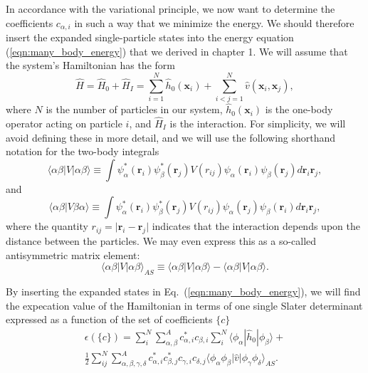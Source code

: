 In accordance with the variational principle, we now want to determine
the coefficients $c_{\alpha, i}$ in such a way that we minimize the
energy. We should therefore insert the expanded single-particle states
into the energy equation (\ref{eqn:many_body_energy}) that we derived
in chapter 1. We will assume that the system's Hamiltonian has the form
\begin{equation}
\hat{H} = \hat{H}_0 + \hat{H}_I = \sum_{i=1}^N \hat{h}_0(\mathbf{x}_i) + \sum_{i<j=1}^N \hat{v}(\mathbf{x}_i,\mathbf{x}_j),
\end{equation}
where $N$ is the number of particles in our system,
$\hat{h}_0(\mathbf{x}_i)$ is the one-body operator acting on particle
$i$, and $\hat{H}_I$ is the interaction. For simplicity, we will avoid
defining these in more detail, and we will use the following shorthand
notation for the two-body integrals
\begin{equation}
\langle \alpha \beta \vert V \vert \alpha \beta \rangle \equiv \int \psi_\alpha^*(\mathbf{r}_i) \psi_\beta^*(\mathbf{r}_j) V(r_{ij})  \psi_\alpha(\mathbf{r}_i) \psi_\beta(\mathbf{r}_j) d\mathbf{r}_i\mathbf{r}_j,
\end{equation}
and
\begin{equation}
\langle \alpha \beta \vert V \beta \alpha \rangle \equiv \int \psi_\alpha^*(\mathbf{r}_i) \psi_\beta^*(\mathbf{r}_j) V(r_{ij})  \psi_\alpha(\mathbf{r}_j) \psi_\beta(\mathbf{r}_i) d\mathbf{r}_i\mathbf{r}_j,
\end{equation}
where the quantity $r_{ij} = \vert \mathbf{r}_i - \mathbf{r}_j \vert$ indicates that the interaction depends upon the distance between the particles. We may even express this as a so-called  antisymmetric matrix element:
\begin{equation}
\langle \alpha \beta \vert V \vert \alpha \beta \rangle_{AS}  \equiv \langle \alpha \beta \vert V \vert \alpha \beta \rangle - \langle \alpha \beta \vert V \vert \alpha \beta \rangle.
\end{equation}

By inserting the expanded states in Eq.~(\ref{eqn:many_body_energy}), we will find the expecation value  
of the Hamiltonian in terms of one single Slater determinant expressed as a function of the set of coefficients $\{c\}$
\begin{multline}
 \epsilon (\{c\}) = \sum_i^N\sum_{\alpha, \beta}^A c_{\alpha,i}^{*}c_{\beta,i} \sum _{i}^N \langle \phi_\alpha | \hat{h}_0 | \phi_\beta \rangle + \\ 
\frac{1}{2}\sum_{ij}^N \sum_{\alpha,\beta, \gamma, \delta} ^A c_{\alpha,i}^{*}c_{\beta,j}^{*}c_{\gamma,i}c_{\delta,j}
 \langle \phi_{\alpha}\phi_{\beta}| \hat{v} |\phi_{\gamma}\phi_{\delta} \rangle_{AS}.
\label{eqn:greek_HF}
\end{multline}

